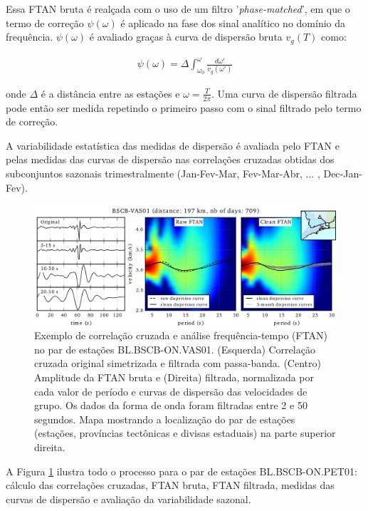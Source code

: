 Essa FTAN bruta é realçada com o uso de um filtro '\textit{phase-matched}', em que o termo de correção $\psi(\omega)$ é aplicado na fase dos sinal analítico no domínio da frequência. $\psi(\omega)$ é avaliado graças à curva de dispersão bruta $v_{g}(T)$ como:

\begin{eqnarray}
\psi(\omega) = \Delta \int_{\omega_{0}}^{\omega} \frac{{d\omega}'}{v_{g}({\omega}')}
\end{eqnarray}

onde $\Delta$ é a distância entre as estações e $\omega = \frac{T}{2\pi}$. Uma curva de dispersão filtrada pode então ser medida repetindo o primeiro passo com o sinal filtrado pelo termo de correção.

A variabilidade estatística das medidas de dispersão é avaliada pelo FTAN e pelas medidas das curvas de dispersão nas correlações cruzadas obtidas dos subconjuntos sazonais trimestralmente (Jan-Fev-Mar, Fev-Mar-Abr, ... , Dec-Jan-Fev). 

\begin{figure}[!ht]
\centering
\includegraphics[scale=0.8]{Figs/correlacao_FTAN.png}
\caption[Exemplo de correlação cruzada e análise frequência-tempo (FTAN) no par de estações BL.BSCB-ON.PET01.]{Exemplo de correlação cruzada e análise frequência-tempo (FTAN) no par de estações BL.BSCB-ON.VAS01. (Esquerda) Correlação cruzada original simetrizada e filtrada com passa-banda. (Centro) Amplitude da FTAN bruta e (Direita) filtrada, normalizada por cada valor de período e curvas de dispersão das velocidades de grupo. Os dados da forma de onda foram filtradas entre 2 e 50 segundos. Mapa mostrando a localização do par de estações (estações, províncias tectônicas e divisas estaduais) na parte superior direita.}
\label{correlacao_FTAN}
\end{figure}

A Figura \ref{correlacao_FTAN} ilustra todo o processo para o par de estações BL.BSCB-ON.PET01: cálculo das correlações cruzadas, FTAN bruta, FTAN filtrada, medidas das curvas de dispersão e avaliação da variabilidade sazonal. 

